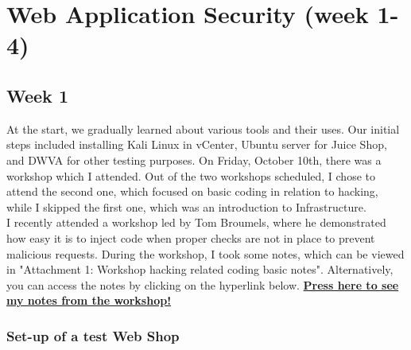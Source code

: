 \documentclass[12pt, letterpaper]{article}
\begin{document}
\newpage
\section{Web Application Security (week 1-4)}
\subsection{Week 1}
At the start, we gradually learned about various tools and their uses. Our initial steps included installing Kali Linux in vCenter, Ubuntu server for Juice Shop, and DWVA for other testing purposes. On Friday, October 10th, there was a workshop which I attended. Out of the two workshops scheduled, I chose to attend the second one, which focused on basic coding in relation to hacking, while I skipped the first one, which was an introduction to Infrastructure.
\break
\\
I recently attended a workshop led by Tom Broumels, where he demonstrated how easy it is to inject code when proper checks are not in place to prevent malicious requests. During the workshop, I took some notes, which can be viewed in "Attachment 1: Workshop hacking related coding basic notes". Alternatively, you can access the notes by clicking on the hyperlink below.
\hyperref[workshop:week1]{\textbf{Press here to see my notes from the workshop!}}

\newpage
\subsubsection{Set-up of a test Web Shop}
\end{document}
